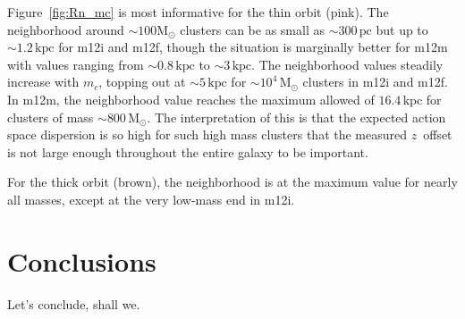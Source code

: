 \documentclass[twocolumn]{aastex62}
\newcommand{\Msun}{\text{M}_\odot}
\newcommand{\pc}{\text{pc}}
\newcommand{\kpc}{\text{kpc}}
\newcommand{\thincolor}{pink}
\newcommand{\thickcolor}{brown}
\begin{document}
Figure~\ref{fig:Rn_mc} is most informative for the thin orbit (\thincolor).
The neighborhood around $\sim100\Msun$ clusters can be as small as
$\sim300\,\pc$ but up to $\sim1.2\,\kpc$ for m12i and m12f, though the
situation is marginally better for m12m with values ranging from
$\sim0.8\,\kpc$ to $\sim3\,\kpc$. The neighborhood values steadily increase
with $m_c$, topping out at $\sim5\,\kpc$ for $\sim10^4\,\Msun$ clusters in
m12i and m12f. In m12m, the neighborhood value reaches the maximum allowed of
$16.4\,\kpc$ for clusters of mass $\sim800\,\Msun$. The interpretation of this
is that the expected action space dispersion is so high for such high mass
clusters that the measured $z$~offset is not large enough throughout the
entire galaxy to be important.

For the thick orbit (brown), the neighborhood is at the maximum value for
nearly all masses, except at the very low-mass end in m12i.

\begin{figure*}
\caption{The neighborhood around an open cluster of mass $m_c$ for the thin,
and thick orbits (\thincolor and \thickcolor, respectively; see
Table~\ref{tab:orbits}) and for each of the FIRE galaxies considered here ---
m12i, m12f, and m12m ({\em left}, {\em center}, and {\em right} panels,
respectively). Given the $z$ offset for a cluster of mass $m_c$ computed in
Figure~\ref{fig:cluster_offset}, we convert this to a chord length using the
result from Figure~\ref{fig:range_deltaphi}. We interpret this chord length as
the ``neighborhood'' around the cluster, i.e. the distance from the cluster
one could go before the $J_z$ error induced by our midplane effect is
comparable to the intrinsic action dispersion of the cluster. When the $z$
offset is larger than the maximum range in Figure~\ref{fig:range_deltaphi}, we
report the maximum chord length ($2\times8.2\,\kpc$). We aso report the same
procedure but using the $\pm1\sigma$ lines from
Figure~\ref{fig:range_deltaphi}, which we plot here as dashed lines. For the
thick orbit (\thickcolor), the neighborhood is quite large and thus the effect
is negligible. However, for the thin orbit (\thincolor), which is closest to
the orbits of nearby open clusters (see Table~\ref{tab:real_clusters}), the
neighborhood is only a few hundred $\pc$ for low-mass clusters.}
\label{fig:Rn_mc}
\end{figure*}

\section{Conclusions}\label{sec:conclusion}
Let's conclude, shall we.
\end{document}
